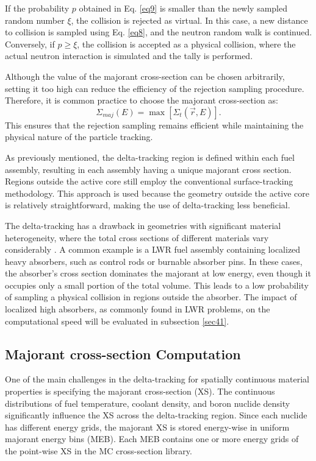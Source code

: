If the probability $p$ obtained in Eq. \ref{eq9} is smaller than the newly sampled random number $\xi$, the collision is rejected as virtual. In this case, a new distance to collision is sampled using Eq. \ref{eq8}, and the neutron random walk is continued. Conversely, if $p \geq \xi$, the collision is accepted as a physical collision, where the actual neutron interaction is simulated and the tally is performed.

Although the value of the majorant cross-section can be chosen arbitrarily, setting it too high can reduce the efficiency of the rejection sampling procedure. Therefore, it is common practice to choose the majorant cross-section as:
\begin{equation}
    \Sigma_{maj}(E) = \max{\left[\Sigma_t(\vec{r},E)\right]}.
    \label{eq10}
\end{equation}
This ensures that the rejection sampling remains efficient while maintaining the physical nature of the particle tracking.

As previously mentioned, the delta-tracking region is defined within each fuel assembly, resulting in each assembly having a unique majorant cross section. Regions outside the active core still employ the conventional surface-tracking methodology. This approach is used because the geometry outside the active core is relatively straightforward, making the use of delta-tracking less beneficial.

The delta-tracking has a drawback in geometries with significant material heterogeneity, where the total cross sections of different materials vary considerably \cite{leppanen_2010}. A common example is a LWR fuel assembly containing localized heavy absorbers, such as control rods or burnable absorber pins. In these cases, the absorber's cross section dominates the majorant at low energy, even though it occupies only a small portion of the total volume. This leads to a low probability of sampling a physical collision in regions outside the absorber. The impact of localized high absorbers, as commonly found in LWR problems, on the computational speed will be evaluated in subsection \ref{sec41}.

\subsection{Majorant cross-section Computation} \label{sec24}

One of the main challenges in the delta-tracking for spatially continuous material properties is specifying the majorant cross-section (XS). The continuous distributions of fuel temperature, coolant density, and boron nuclide density significantly influence the XS across the delta-tracking region. Since each nuclide has different energy grids, the majorant XS is stored energy-wise in uniform majorant energy bins (MEB). Each MEB contains one or more energy grids of the point-wise XS in the MC cross-section library.

